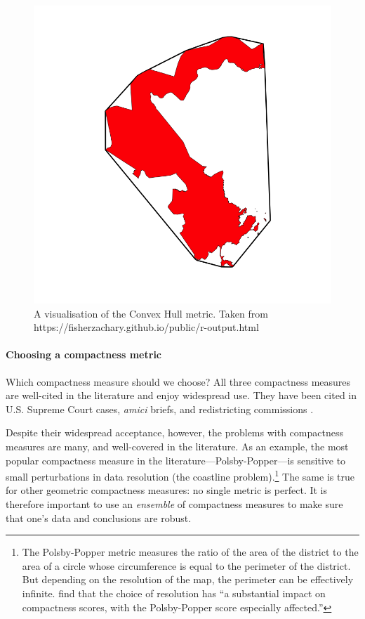 \documentclass[]{article}
\let\oldparagraph\paragraph
\renewcommand{\paragraph}[1]{\oldparagraph{#1}\mbox{}}
\begin{document}
\begin{figure}
\centering
\includegraphics{img/ch.png}
\caption{A visualisation of the Convex Hull metric. Taken from
https://fisherzachary.github.io/public/r-output.html}
\end{figure}

\hypertarget{choosing-a-compactness-metric}{%
\paragraph{Choosing a compactness
metric}\label{choosing-a-compactness-metric}}

Which compactness measure should we choose? All three compactness
measures are well-cited in the literature and enjoy widespread use. They
have been cited in U.S. Supreme Court cases, \emph{amici} briefs, and
redistricting commissions \citep{moncrief2011}.

Despite their widespread acceptance, however, the problems with
compactness measures are many, and well-covered in the literature. As an
example, the most popular compactness measure in the
literature---Polsby-Popper---is sensitive to small perturbations in data
resolution (the coastline problem).\footnote{The Polsby-Popper metric
  measures the ratio of the area of the district to the area of a circle
  whose circumference is equal to the perimeter of the district. But
  depending on the resolution of the map, the perimeter can be
  effectively infinite. \citeauthor{bswp} find that the choice of
  resolution has ``a substantial impact on compactness scores, with the
  Polsby-Popper score especially affected.''} The same is true for other
geometric compactness measures: no single metric is perfect. It is
therefore important to use an \emph{ensemble} of compactness measures to
make sure that one's data and conclusions are robust.
\end{document}
